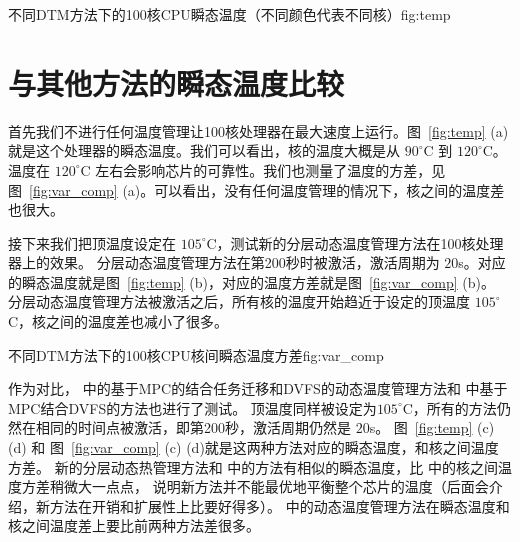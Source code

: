 \begin{pics}{不同DTM方法下的100核CPU瞬态温度（不同颜色代表不同核）}{fig:temp}
 \end{pics}
 
\section{与其他方法的瞬态温度比较}\label{sec:temp_comp}
首先我们不进行任何温度管理让100核处理器在最大速度上运行。图~\ref{fig:temp} (a)就是这个处理器的瞬态温度。我们可以看出，核的温度大概是从 $90^{\circ}$C
到 $120^{\circ}$C。温度在 $120^{\circ}$C 左右会影响芯片的可靠性。我们也测量了温度的方差，见图~\ref{fig:var_comp} (a)。可以看出，没有任何温度管理的情况下，核之间的温度差也很大。


接下来我们把顶温度设定在 $105^{\circ}$C，测试新的分层动态温度管理方法在100核处理器上的效果。
分层动态温度管理方法在第200秒时被激活，激活周期为 $20$s。对应的瞬态温度就是图~\ref{fig:temp} (b)，对应的温度方差就是图~\ref{fig:var_comp} (b)。
分层动态温度管理方法被激活之后，所有核的温度开始趋近于设定的顶温度 $105^{\circ}$C，核之间的温度差也减小了很多。

\begin{pics}[H]{不同DTM方法下的100核CPU核间瞬态温度方差}{fig:var_comp}
 \end{pics}
 
作为对比， \cite{MaWang:APCCAS'14} 中的基于MPC的结合任务迁移和DVFS的动态温度管理方法和 \cite{Zanini:ECCTD'09} 中基于MPC结合DVFS的方法也进行了测试。
顶温度同样被设定为$105^{\circ}$C，所有的方法仍然在相同的时间点被激活，即第200秒，激活周期仍然是 $20$s。
图~\ref{fig:temp} (c) (d) 和 图~\ref{fig:var_comp} (c) (d)就是这两种方法对应的瞬态温度，和核之间温度方差。
新的分层动态热管理方法和 \cite{MaWang:APCCAS'14} 中的方法有相似的瞬态温度，比 \cite{MaWang:APCCAS'14}中的核之间温度方差稍微大一点点，
说明新方法并不能最优地平衡整个芯片的温度（后面会介绍，新方法在开销和扩展性上比\cite{MaWang:APCCAS'14}要好得多）。
\cite{Zanini:ECCTD'09} 中的动态温度管理方法在瞬态温度和核之间温度差上要比前两种方法差很多。

